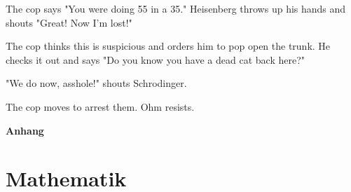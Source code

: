 \documentclass[fs, footer]{latex4ei}
\begin{document}
\begin{multicols*}{4}
The cop says "You were doing 55 in a 35." Heisenberg throws up his hands and shouts "Great! Now I'm lost!"

The cop thinks this is suspicious and orders him to pop open the trunk. He checks it out and says "Do you know you have a dead cat back here?"

"We do now, asshole!" shouts Schrodinger.

The cop moves to arrest them. Ohm resists.



\newpage
{\Huge \bf Anhang}


\section{Mathematik}





\end{multicols*}
\end{document}
